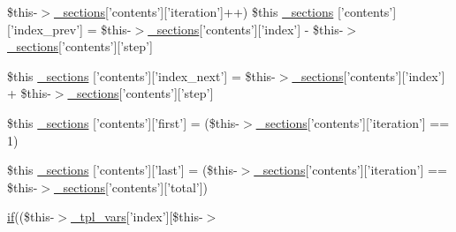 \begin{DoxyCompactItemize}
\$this-\/$>$\hyperlink{_06_06127_05_06_0612781687_05pkgelementindex_8tpl_8php_a9e3d26b39edfe29c3f29b8035ef33828}{\-\_\-sections}\mbox{[}'contents'\mbox{]}\mbox{[}'iteration'\mbox{]}++) \*
\$this \hyperlink{media_234d6fa4bfd5eef6424a9ddc74a166350_2_06_06-19_05_06_06-1910644431_05basicindex_8tpl_8php_afe6a95a2541e38fac3703e6a3e6e8c2b}{\-\_\-sections} \mbox{[}'contents'\mbox{]}\mbox{[}'index\-\_\-prev'\mbox{]} = \$this-\/$>$\hyperlink{_06_06127_05_06_0612781687_05pkgelementindex_8tpl_8php_a9e3d26b39edfe29c3f29b8035ef33828}{\-\_\-sections}\mbox{[}'contents'\mbox{]}\mbox{[}'index'\mbox{]} -\/ \$this-\/$>$\hyperlink{_06_06127_05_06_0612781687_05pkgelementindex_8tpl_8php_a9e3d26b39edfe29c3f29b8035ef33828}{\-\_\-sections}\mbox{[}'contents'\mbox{]}\mbox{[}'step'\mbox{]}
\item 
\$this \hyperlink{media_234d6fa4bfd5eef6424a9ddc74a166350_2_06_06-19_05_06_06-1910644431_05basicindex_8tpl_8php_ac545c8e745c0c0b1995bd3ee2f78278f}{\-\_\-sections} \mbox{[}'contents'\mbox{]}\mbox{[}'index\-\_\-next'\mbox{]} = \$this-\/$>$\hyperlink{_06_06127_05_06_0612781687_05pkgelementindex_8tpl_8php_a9e3d26b39edfe29c3f29b8035ef33828}{\-\_\-sections}\mbox{[}'contents'\mbox{]}\mbox{[}'index'\mbox{]} + \$this-\/$>$\hyperlink{_06_06127_05_06_0612781687_05pkgelementindex_8tpl_8php_a9e3d26b39edfe29c3f29b8035ef33828}{\-\_\-sections}\mbox{[}'contents'\mbox{]}\mbox{[}'step'\mbox{]}
\item 
\$this \hyperlink{media_234d6fa4bfd5eef6424a9ddc74a166350_2_06_06-19_05_06_06-1910644431_05basicindex_8tpl_8php_a53541e3ce33ac24750574a8a0fe10f8d}{\-\_\-sections} \mbox{[}'contents'\mbox{]}\mbox{[}'first'\mbox{]} = (\$this-\/$>$\hyperlink{_06_06127_05_06_0612781687_05pkgelementindex_8tpl_8php_a9e3d26b39edfe29c3f29b8035ef33828}{\-\_\-sections}\mbox{[}'contents'\mbox{]}\mbox{[}'iteration'\mbox{]} == 1)
\item 
\$this \hyperlink{media_234d6fa4bfd5eef6424a9ddc74a166350_2_06_06-19_05_06_06-1910644431_05basicindex_8tpl_8php_a69e9b5c157296fb14160c4ef27275f65}{\-\_\-sections} \mbox{[}'contents'\mbox{]}\mbox{[}'last'\mbox{]} = (\$this-\/$>$\hyperlink{_06_06127_05_06_0612781687_05pkgelementindex_8tpl_8php_a9e3d26b39edfe29c3f29b8035ef33828}{\-\_\-sections}\mbox{[}'contents'\mbox{]}\mbox{[}'iteration'\mbox{]} == \$this-\/$>$\hyperlink{_06_06127_05_06_0612781687_05pkgelementindex_8tpl_8php_a9e3d26b39edfe29c3f29b8035ef33828}{\-\_\-sections}\mbox{[}'contents'\mbox{]}\mbox{[}'total'\mbox{]})
\item 
\hyperlink{_setup_8inc_8php_ad0184337b31d13763ec8751feff4aabe}{if}((\$this-\/$>$\hyperlink{_06_06127_05_06_0612781687_05pkgelementindex_8tpl_8php_a4a4846d8e68d455590131a05697f67a3}{\-\_\-tpl\-\_\-vars}\mbox{[}'index'\mbox{]}\mbox{[}\$this-\/$>$\*

\end{DoxyCompactItemize}
